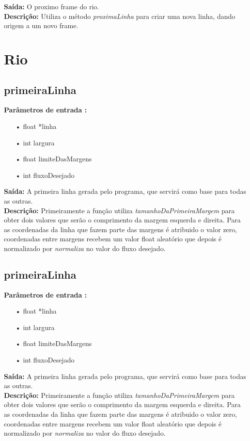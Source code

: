 \documentclass[a4paper,11pt]{article}
\begin{document}
\textbf{Saída:} O proximo frame do rio.\\

\textbf{Descrição:} Utiliza o método \textit{proximaLinha} para criar uma nova linha, dando origem a um novo frame.

\section{Rio}

\subsection{primeiraLinha}
\textbf{Parâmetros de entrada :}
\begin{enumerate}
\item[•]{float *linha}
\item[•]{int largura}
\item[•]{float limiteDasMargens}
\item[•]{int fluxoDesejado}
\end{enumerate}

\textbf{Saída:} A primeira linha gerada pelo programa, que servirá como base para todas
as outras.\\

\textbf{Descrição:} Primeiramente a fun\c{c}ão utiliza \textit{tamanhoDaPrimeiraMargem} para obter dois valores que serão o comprimento da margem esquerda e direita. Para as coordenadas da linha que fazem parte das margens é atribuido o valor zero, coordenadas entre margens recebem um valor float aleatório que depois é normalizado por \textit{normaliza} no valor do fluxo desejado. 

\subsection{primeiraLinha}
\textbf{Parâmetros de entrada :}
\begin{enumerate}
\item[•]{float *linha}
\item[•]{int largura}
\item[•]{float limiteDasMargens}
\item[•]{int fluxoDesejado}
\end{enumerate}

\textbf{Saída:} A primeira linha gerada pelo programa, que servirá como base para todas
as outras.\\

\textbf{Descrição:} Primeiramente a fun\c{c}ão utiliza \textit{tamanhoDaPrimeiraMargem} para obter dois valores que serão o comprimento da margem esquerda e direita. Para as coordenadas da linha que fazem parte das margens é atribuido o valor zero, coordenadas entre margens recebem um valor float aleatório que depois é normalizado por \textit{normaliza} no valor do fluxo desejado.
\end{document}
